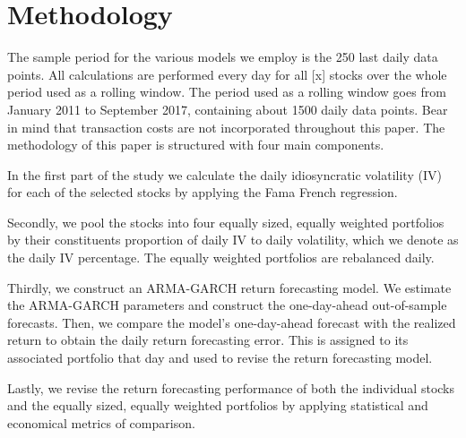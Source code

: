 \chapter{Methodology}
\label{Methodology}

The sample period for the various models we employ is the 250 last daily data points. All calculations are performed every day for all [x] stocks over the whole period used as a rolling window. The period used as a rolling window goes from January 2011 to September 2017, containing about 1500 daily data points. Bear in mind that transaction costs are not incorporated throughout this paper. The methodology of this paper is structured with four main components. 

In the first part of the study we calculate the daily idiosyncratic volatility (IV) for each of the selected stocks by applying the Fama French regression.

Secondly, we pool the stocks into four equally sized, equally weighted portfolios by their constituents proportion of daily IV to daily volatility, which we denote as the daily IV percentage. The equally weighted portfolios are rebalanced daily.

Thirdly, we construct an ARMA-GARCH return forecasting model. We estimate the ARMA-GARCH parameters and construct the one-day-ahead out-of-sample forecasts. Then, we compare the model’s one-day-ahead forecast with the realized return to obtain the daily return forecasting error. This is assigned to its associated portfolio that day and used to revise the return forecasting model. 

Lastly, we revise the return forecasting performance of both the individual stocks and the equally sized, equally weighted portfolios by applying statistical and economical metrics of comparison.

